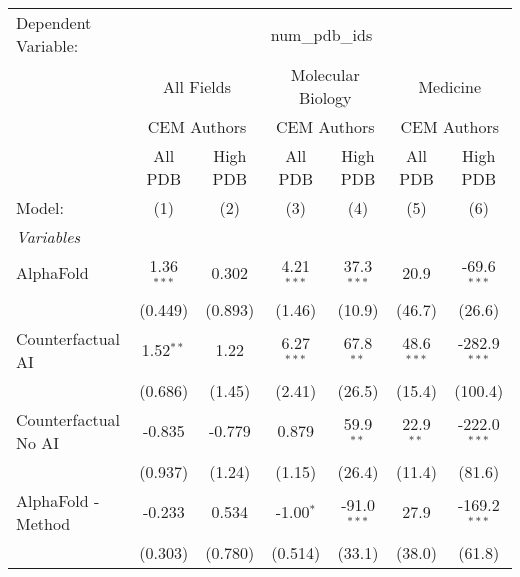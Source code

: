 \begingroup
\centering
\begin{tabular}{lcccccc}
   \tabularnewline \midrule \midrule
   Dependent Variable: & \multicolumn{6}{c}{num\_pdb\_ids}\\
 & \multicolumn{2}{c}{All Fields} & \multicolumn{2}{c}{Molecular Biology} & \multicolumn{2}{c}{Medicine} \\
\cmidrule(lr){2-3} \cmidrule(lr){4-5} \cmidrule(lr){6-7}
 & \multicolumn{2}{c}{CEM Authors} & \multicolumn{2}{c}{CEM Authors} & \multicolumn{2}{c}{CEM Authors} \\
\cmidrule(lr){2-3} \cmidrule(lr){4-5} \cmidrule(lr){6-7}
 & \multicolumn{1}{c}{All PDB} & \multicolumn{1}{c}{High PDB} & \multicolumn{1}{c}{All PDB} & \multicolumn{1}{c}{High PDB} & \multicolumn{1}{c}{All PDB} & \multicolumn{1}{c}{High PDB} \\
\cmidrule(lr){2-2} \cmidrule(lr){3-3} \cmidrule(lr){4-4} \cmidrule(lr){5-5} \cmidrule(lr){6-6} \cmidrule(lr){7-7}
   Model:                                                     & (1)          & (2)       & (3)          & (4)           & (5)          & (6)\\  
   \midrule
   \emph{Variables}\\
   AlphaFold                                                  & 1.36$^{***}$ & 0.302     & 4.21$^{***}$ & 37.3$^{***}$  & 20.9         & -69.6$^{***}$\\   
                                                              & (0.449)      & (0.893)   & (1.46)       & (10.9)        & (46.7)       & (26.6)\\   
   Counterfactual AI                                          & 1.52$^{**}$  & 1.22      & 6.27$^{***}$ & 67.8$^{**}$   & 48.6$^{***}$ & -282.9$^{***}$\\   
                                                              & (0.686)      & (1.45)    & (2.41)       & (26.5)        & (15.4)       & (100.4)\\   
   Counterfactual No AI                                       & -0.835       & -0.779    & 0.879        & 59.9$^{**}$   & 22.9$^{**}$  & -222.0$^{***}$\\   
                                                              & (0.937)      & (1.24)    & (1.15)       & (26.4)        & (11.4)       & (81.6)\\   
   AlphaFold - Method                                         & -0.233       & 0.534     & -1.00$^{*}$  & -91.0$^{***}$ & 27.9         & -169.2$^{***}$\\   
                                                              & (0.303)      & (0.780)   & (0.514)      & (33.1)        & (38.0)       & (61.8)\\   

\end{tabular}
